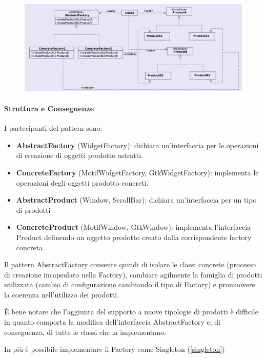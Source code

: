 \begin{figure}[H]
    \centering
    \includegraphics[width=1\linewidth]{assets/pattern/abstract-factory/abstract-factory-struttura.png}
\end{figure}


\paragraph{Struttura e Conseguenze} I partecipanti del pattern sono:
\begin{itemize}
    \item \textbf{AbstractFactory} (WidgetFactory): dichiara un’interfaccia per le operazioni di creazione di oggetti prodotto astratti.
    \item \textbf{ConcreteFactory} (MotifWidgetFactory, GtkWidgetFactory): implementa le operazioni degli oggetti prodotto concreti. 
    \item \textbf{AbstractProduct} (Window, ScrollBar): dichiara un’interfaccia per un tipo di prodotti
    \item \textbf{ConcreteProduct} (MotifWindow, GtkWindow): implementa l’interfaccia Product definendo un oggetto prodotto creato dalla corrispondente factory concreta.
\end{itemize}

Il pattern AbstractFactory consente quindi di isolare le classi concrete (processo di creazione incapsulato nella Factory), cambiare agilmente la famiglia di prodotti utilizzata (cambio di configurazione cambiando il tipo di Factory) e promuovere la coerenza nell'utilizzo dei prodotti.

È bene notare che l'aggiunta del supporto a nuove tipologie di prodotti è difficile in quanto comporta la modifica dell'interfaccia AbstractFactory e, di conseguenza, di tutte le classi che la implementano.

In più è possibile implementare il Factory come Singleton (\ref{singleton})

\newpage